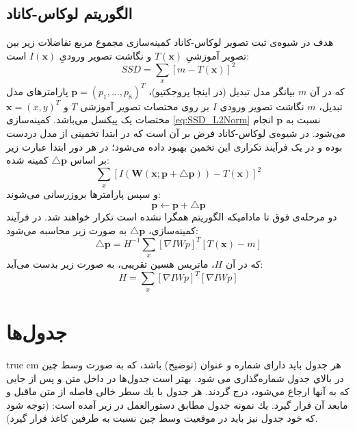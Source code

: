 \documentclass[11pt, twoside]{imsproc}
\let\LTRfootnote\footnoteA
\begin{document}
\subsection{الگوریتم لوکاس-کاناد}
 هدف در شیوه‌ی ثبت تصویر لوکاس-کاناد کمینه‌سازی مجموع مربع تفاضلات زیر بین تصویر آموزشیِ $T(\mathbf{x})$ و نگاشت تصویر ورودیِ $I(\mathbf{x})$ است:
 \begin{equation}
\label{eq:SSD_L2Norm}
    SSD=\sum_x[m-T(\mathbf{x})]^2
\end{equation}
که در آن $m$ بیانگر مدل تبدیل‌ (در اینجا پروجکتیو)، $\mathbf{p}=(p_1,\dots,p_8)^T$ پارامترهای مدل تبدیل، $m$ نگاشت تصویر ورودی $I$ بر روی مختصات تصویر آموزشی $T$ و $\mathbf{x} =(x,y)^T$ مختصات یک پیکسل می‌باشد.
 کمینه‌سازی \eqref{eq:SSD_L2Norm} نسبت به $\mathbf{p}$ انجام می‌شود. 
در شیوه‌ی لوکاس-کاناد فرض بر آن است که در ابتدا تخمینی از مدل دردست بوده و در یک فرآیند تکراری این تخمین بهبود داده می‌شود؛
در هر دور ابتدا عبارت زیر بر اساس $\triangle\mathbf{p}$ کمینه شده:
\begin{equation}
\label{eq:SSD_L2Norm_deltap}
    \sum_x[I(\mathbf{W}(\mathbf{x;\mathbf{p+\triangle p}}))-T(\mathbf{x})]^2
\end{equation}
 و سپس پارامترها بروزرسانی می‌شوند:
\begin{equation}
    \mathbf{p}\leftarrow\mathbf{p+\triangle p}
\end{equation}
دو مرحله‌ی فوق تا مادامیکه الگوریتم همگرا نشده است تکرار خواهند شد. در فرآیند کمینه‌سازی، $\mathbf{\triangle p}$ به صورت زیر محاسبه می‌شود:
\begin{equation}
\label{eq:deltap}
    \triangle\mathbf{p} = H^{-1} \sum_x[\nabla I{W}{p}]^T[T(\mathbf{x})-m]
\end{equation}
که در آن $H$، ماتریس هسین تقریبی\LTRfootnote{ Approximate Hessian Matrix}، به صورت زیر بدست می‌آید:
\begin{equation}
\label{eq:Hessian}
  H = \sum_x[\nabla I{W}{p}]^T[\nabla I{W}{p}]
\end{equation}

\section{جدول‌ها}
 true cm
هر جدول بايد دارای شماره و عنوان (توضيح) باشد، كه به صورت وسط چين در بالاي جدول  شماره‌گذاری می شود. بهتر است جدول‌ها در داخل متن و پس از جايی كه به آنها ارجاع مي‌شود، درج گردند.  هر جدول با يك سطر خالی فاصله از متن ماقبل و مابعد آن قرار گيرد. يك نمونه جدول مطابق دستورالعمل در زير آمده است: (توجه شود كه خود جدول نيز بايد در موقعيت وسط چين نسبت به طرفين كاغذ قرار گيرد).
\\
\end{document}

